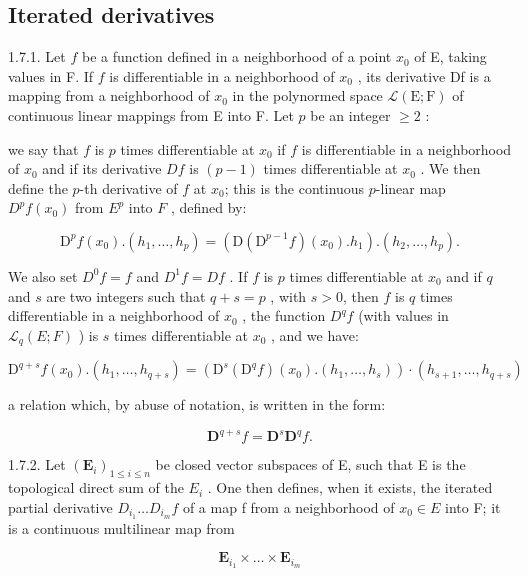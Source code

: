 \subsection{Iterated derivatives}

1.7.1. Let \(f\) be a function defined in a neighborhood of a point \(x_{0}\) of E, taking values in F. If \(f\) is differentiable in a neighborhood of \(x_{0}\) , its derivative Df is a mapping from a neighborhood of \(x_{0}\) in the polynormed space \(\mathcal{L}(\mathrm{E};\mathrm{F})\) of continuous linear mappings from E into F. Let \(p\) be an integer \(\geqslant 2\) :

we say that \(f\) is \(p\) times differentiable at \(x_0\) if \(f\) is differentiable in a neighborhood of \(x_0\) and if its derivative \(Df\) is \((p - 1)\) times differentiable at \(x_0\) . We then define the \(p\)-th derivative of \(f\) at \(x_0\); this is the continuous \(p\)-linear map \(D^p f(x_0)\) from \(E^p\) into \(F\) , defined by:

\[
\mathrm{D} ^ {p} f (x _ {0}). (h _ {1}, \dots , h _ {p}) = (\mathrm{D} (\mathrm{D} ^ {p - 1} f) (x _ {0}). h _ {1}). (h _ {2}, \dots , h _ {p}).
\]

We also set \(D^{0}f = f\) and \(D^{1}f = Df\) . If \(f\) is \(p\) times differentiable at \(x_{0}\) and if \(q\) and \(s\) are two integers such that \(q + s = p\) , with \(s > 0\), then \(f\) is \(q\) times differentiable in a neighborhood of \(x_{0}\) , the function \(D^{q}f\) (with values in \(\mathcal{L}_{q}(E; F)\) ) is \(s\) times differentiable at \(x_{0}\) , and we have:

\[
\mathrm{D} ^ {q + s} f (x _ {0}). (h _ {1}, \dots , h _ {q + s}) = (\mathrm{D} ^ {s} (\mathrm{D} ^ {q} f) (x _ {0}). (h _ {1}, \dots , h _ {s})) \cdot (h _ {s + 1}, \dots , h _ {q + s})
\]

a relation which, by abuse of notation, is written in the form:

\[
\mathbf {D} ^ {q + s} f = \mathbf {D} ^ {s} \mathbf {D} ^ {q} f.
\]

1.7.2. Let \((\mathbf{E}_{i})_{1\leqslant i\leqslant n}\) be closed vector subspaces of E, such that E is the topological direct sum of the \(E_{i}\) . One then defines, when it exists, the iterated partial derivative \(D_{i_{1}}\ldots D_{i_{m}}f\) of a map f from a neighborhood of \(x_{0}\in E\) into F; it is a continuous multilinear map from

\[
\mathbf {E} _ {i _ {1}} \times \dots \times \mathbf {E} _ {i _ {m}}
\]

